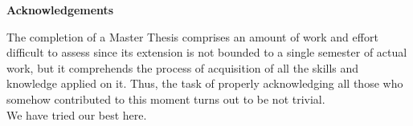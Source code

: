 \newenvironment{acknowledgements}%
    {\null\vfill\begin{center}%
    \bfseries Acknowledgements\end{center}}%
    {\vfill\null}
        \begin{acknowledgements}
        The completion of a Master Thesis comprises an amount of work and effort difficult to assess since its extension is not bounded to a single semester of actual work, but it comprehends the process of acquisition of all the skills and knowledge applied on it.
        Thus, the task of properly acknowledging all those who somehow contributed to this moment turns out to be not trivial.\\ 
        We have tried our best here.

        \end{acknowledgements}